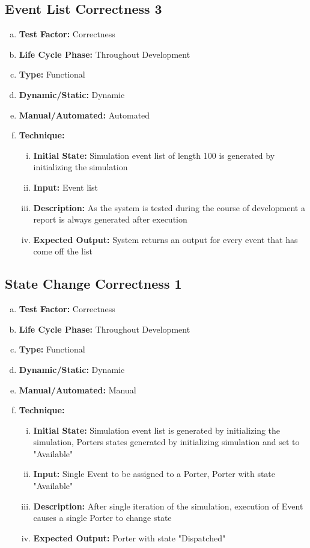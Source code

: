 \documentclass[paper=letter, fontsize=10pt]{scrartcl}
\numberwithin{equation}{section}		%
\numberwithin{figure}{section}			%
\numberwithin{table}{section}				%
\begin{document}
\subsection{Event List Correctness 3}
\begin{enumerate}[(a)]
	\item \textbf{Test Factor:} Correctness
	\item \textbf{Life Cycle Phase:} Throughout Development
	\item \textbf{Type:} Functional
	\item \textbf{Dynamic/Static:} Dynamic
	\item \textbf{Manual/Automated:} Automated
	\item \textbf{Technique:} 
		\begin{enumerate}[(i)]
			\item \textbf{Initial State:} Simulation event list of length 100 is generated by initializing the simulation	
			\item \textbf{Input:} Event list
			\item \textbf{Description:} As the system is tested during the course of development a report is always generated after execution
			\item \textbf{Expected Output:} System returns an output for every event that has come off the list
		\end{enumerate}
\end{enumerate}

\subsection{State Change Correctness 1}
\begin{enumerate}[(a)]
	\item \textbf{Test Factor:} Correctness
	\item \textbf{Life Cycle Phase:} Throughout Development
	\item \textbf{Type:} Functional
	\item \textbf{Dynamic/Static:} Dynamic
	\item \textbf{Manual/Automated:} Manual
	\item \textbf{Technique:}
		\begin{enumerate}[(i)]
			\item \textbf{Initial State:} Simulation event list is generated by initializing the simulation, Porters states generated by initializing simulation and set to "Available"
			\item \textbf{Input:} Single Event to be assigned to a Porter, Porter with state "Available"
			\item \textbf{Description:} After single iteration of the simulation, execution of Event causes a single Porter to change state
			\item \textbf{Expected Output:} Porter with state "Dispatched"
		\end{enumerate}
\end{enumerate}
\end{document}
